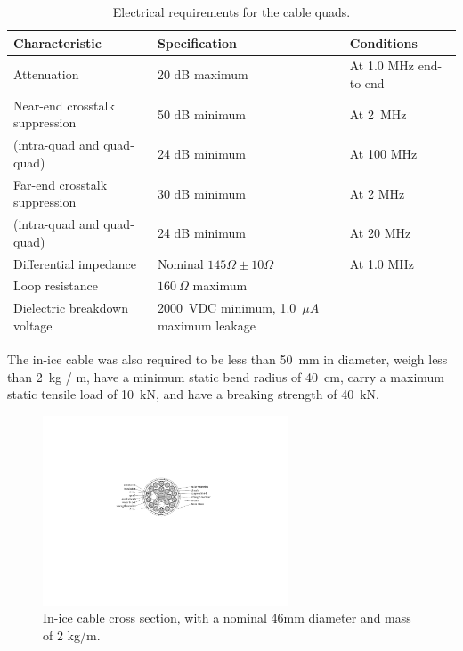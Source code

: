 \begin{table}[h]
  \centering
  \caption{Electrical requirements for the cable quads.} 
  \begin{tabularx}{\textwidth}{ l X  X  }
    \toprule
    Characteristic& Specification & Conditions \\
    \midrule

    Attenuation & 20 dB maximum & At 1.0 MHz end-to-end \\
%

   Near-end crosstalk suppression& 50 dB minimum & At 2~MHz \\
(intra-quad and quad-quad)&24 dB minimum& At 100 MHz\\
   Far-end crosstalk suppression& 30 dB minimum & At 2 MHz \\
(intra-quad and quad-quad)&24 dB minimum& At 20 MHz\\


    Differential impedance & Nominal $145\Omega \pm 10\Omega$ & At 1.0 MHz \\

    Loop resistance & $160~\Omega$ maximum & \\

    Dielectric breakdown voltage & 2000~VDC minimum, 1.0~$\mu A$ maximum
    leakage & \\
    \bottomrule  
  \end{tabularx}
  \label{tab:quad_requirements}
\end{table}

 The in-ice cable was also required to be less than 50~mm in
 diameter, weigh less than 2~kg / m, have a minimum static bend radius of 40~cm,
 carry a maximum static tensile load of 10~kN, and have a breaking strength
 of 40~kN.
 
\begin{figure}
  \centering
  \includegraphics[width=0.65\textwidth]{graphics/cables/labeled_inice_xsection.pdf}
  \caption{\label{fig:cable_xsection}In-ice cable cross
    section, with a nominal 46mm diameter and mass of 2 kg/m.} 
\end{figure}

